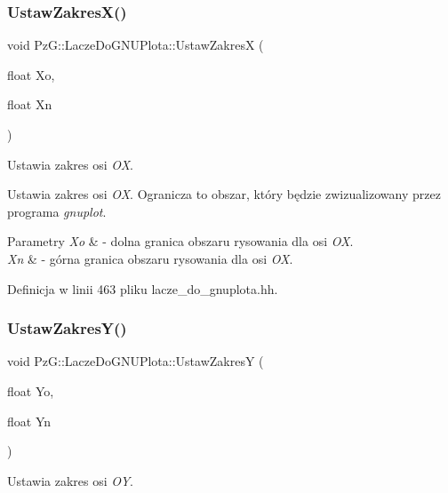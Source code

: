 \subsubsection{\texorpdfstring{Ustaw\+Zakres\+X()}{UstawZakresX()}}
{\footnotesize\ttfamily void Pz\+G\+::\+Lacze\+Do\+G\+N\+U\+Plota\+::\+Ustaw\+ZakresX (\begin{DoxyParamCaption}\item[{float}]{Xo,  }\item[{float}]{Xn }\end{DoxyParamCaption})\hspace{0.3cm}{\ttfamily [inline]}}



Ustawia zakres osi {\itshape OX}. 

Ustawia zakres osi {\itshape OX}. Ogranicza to obszar, który będzie zwizualizowany przez programa {\itshape gnuplot}. 
\begin{DoxyParams}{Parametry}
{\em Xo} & -\/ dolna granica obszaru rysowania dla osi {\itshape OX}. \\
\hline
{\em Xn} & -\/ górna granica obszaru rysowania dla osi {\itshape OX}. \\
\hline
\end{DoxyParams}


Definicja w linii 463 pliku lacze\+\_\+do\+\_\+gnuplota.\+hh.

\mbox{\label{class_pz_g_1_1_lacze_do_g_n_u_plota_a54c6e9cf9ab2eae479451fd953c2717c}} 
\subsubsection{\texorpdfstring{Ustaw\+Zakres\+Y()}{UstawZakresY()}}
{\footnotesize\ttfamily void Pz\+G\+::\+Lacze\+Do\+G\+N\+U\+Plota\+::\+Ustaw\+ZakresY (\begin{DoxyParamCaption}\item[{float}]{Yo,  }\item[{float}]{Yn }\end{DoxyParamCaption})\hspace{0.3cm}{\ttfamily [inline]}}



Ustawia zakres osi {\itshape OY}. 

